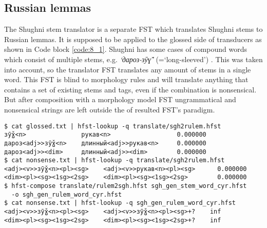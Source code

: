 \subsection{Russian lemmas } \label{rulemm_section}
The Shughni stem translator is a separate FST which translates Shughni stems to Russian lemmas. It is supposed to be applied to the glossed side of transducers as shown in Code block \ref{code:8_1}. Shughni has some cases of compound words which consist of multiple stems, e.g. \textit{`дароз-зӯɣ̌'} (=`long-sleeved') \parencite[173]{parker_shughni_2023}. This was taken into account, so the translator FST translates any amount of stems in a single word. This FST is blind to morphology rules and will translate anything that contains a set of existing stems and tags, even if the combination is nonsensical. But after composition with a morphology model FST ungrammatical and nonsensical strings are left outside the of resulted FST's paradigm.

\begin{code_frame}[float,floatplacement=h!]
    \begin{footnotesize}
    \begin{verbatim}
$ cat glossed.txt | hfst-lookup -q translate/sgh2rulem.hfst 
зӯɣ̌<n>               рукав<n>                  0.000000
дароз<adj>>зӯɣ̌<n>    длинный<adj>>рукав<n>     0.000000
дароз<adj>><dim>     длинный<adj>><dim>        0.000000
$ cat nonsense.txt | hfst-lookup -q translate/sgh2rulem.hfst 
<adj><v>>зӯɣ̌<n><pl><sg>    <adj><v>>рукав<n><pl><sg>      0.000000
<dim><pl><sg><1sg><2sg>    <dim><pl><sg><1sg><2sg>        0.000000
$ hfst-compose translate/rulem2sgh.hfst sgh_gen_stem_word_cyr.hfst
  -o sgh_gen_rulem_word_cyr.hfst
$ cat nonsense.txt | hfst-lookup -q sgh_gen_rulem_word_cyr.hfst
<adj><v>>зӯɣ̌<n><pl><sg>    <adj><v>>зӯɣ̌<n><pl><sg>+?    inf
<dim><pl><sg><1sg><2sg>    <dim><pl><sg><1sg><2sg>+?    inf
    \end{verbatim}
    \end{footnotesize}
    \tcblower
    \label{code:8_1}
\end{code_frame}

